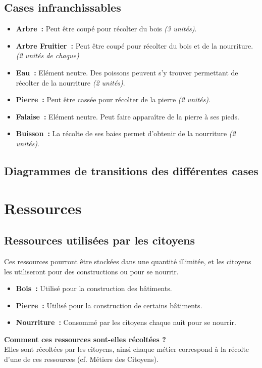 \documentclass[a4paper]{article}
\begin{document}
      \subsection{Cases infranchissables}
        \begin{itemize}
          \item \textbf{Arbre :} \small{ Peut être coupé pour récolter du bois \textit{(3 unités)}.}
          \item \textbf{Arbre Fruitier :} \small{ Peut être coupé pour récolter du bois et de la nourriture. \textit{(2 unités de chaque)}}
          \item \textbf{Eau :} \small{ Elément neutre. Des poissons peuvent s'y trouver permettant de récolter de la nourriture \textit{(2 unités)}.}
          \item \textbf{Pierre :} \small{ Peut être cassée pour récolter de la pierre \textit{(2 unités)}.}
          \item \textbf{Falaise :} \small{ Elément neutre. Peut faire apparaître de la pierre à ses pieds.}
          \item \textbf{Buisson :} \small{ La récolte de ses baies permet d'obtenir de la nourriture \textit{(2 unités)}.}
        \end{itemize}

      \subsection{Diagrammes de transitions des différentes cases}


    \section{Ressources}

      \subsection{Ressources utilisées par les citoyens}
        Ces ressources pourront être stockées dans une quantité illimitée, et les citoyens les utiliseront pour des constructions ou pour se nourrir.
        \begin{itemize}
          \item \textbf{Bois :} \small{ Utilisé pour la construction des bâtiments.}
          \item \textbf{Pierre :} \small{ Utilisé pour la construction de certains bâtiments.}
          \item \textbf{Nourriture :} \small{ Consommé par les citoyens chaque nuit pour se nourrir.}
        \end{itemize}
        \textbf{Comment ces ressources sont-elles récoltées ? }\\Elles sont récoltées par les citoyens, ainsi chaque métier correspond à la récolte d'une de ces ressources (cf. Métiers des Citoyens).
\end{document}
